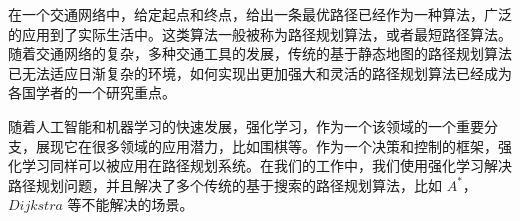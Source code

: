 \documentclass{standalone}
\begin{document}
	
\begin{chineseabstract}

在一个交通网络中，给定起点和终点，给出一条最优路径已经作为一种算法，广泛的应用到了实际生活中。这类算法一般被称为路径规划算法，或者最短路径算法。随着交通网络的复杂，多种交通工具的发展，传统的基于静态地图的路径规划算法已无法适应日渐复杂的环境，如何实现出更加强大和灵活的路径规划算法已经成为各国学者的一个研究重点。

随着人工智能和机器学习的快速发展，强化学习，作为一个该领域的一个重要分支，展现它在很多领域的应用潜力，比如围棋等。作为一个决策和控制的框架，强化学习同样可以被应用在路径规划系统。在我们的工作中，我们使用强化学习解决路径规划问题，并且解决了多个传统的基于搜索的路径规划算法，比如 $A^{*}$，$Dijkstra$ 等不能解决的场景。

\end{chineseabstract}
\end{document}
